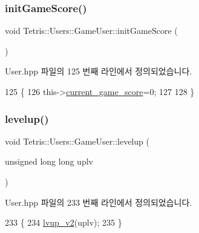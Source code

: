 \subsubsection{\texorpdfstring{init\+Game\+Score()}{initGameScore()}}
{\footnotesize\ttfamily void Tetris\+::\+Users\+::\+Game\+User\+::init\+Game\+Score (\begin{DoxyParamCaption}{ }\end{DoxyParamCaption})\hspace{0.3cm}{\ttfamily [inline]}}



User.\+hpp 파일의 125 번째 라인에서 정의되었습니다.


\begin{DoxyCode}
125                                 \{
126                 this->\hyperlink{class_tetris_1_1_users_1_1_game_user_aae9d0156964b3872f7cd3917ae662ec2}{current\_game\_score}=0;
127                 
128             \}
\end{DoxyCode}
\mbox{\label{class_tetris_1_1_users_1_1_game_user_ae5f2fd276485ee3f677896c3cc03462a}} 
\subsubsection{\texorpdfstring{levelup()}{levelup()}}
{\footnotesize\ttfamily void Tetris\+::\+Users\+::\+Game\+User\+::levelup (\begin{DoxyParamCaption}\item[{unsigned long long}]{uplv }\end{DoxyParamCaption})\hspace{0.3cm}{\ttfamily [inline]}}



User.\+hpp 파일의 233 번째 라인에서 정의되었습니다.


\begin{DoxyCode}
233                                                  \{
234                 \hyperlink{class_tetris_1_1_users_1_1_game_user_aacc605ed22d2b982a106659ef94fb3c9}{lvup\_v2}(uplv);
235             \}
\end{DoxyCode}
\mbox{\label{class_tetris_1_1_users_1_1_game_user_af8ec964e749d90e60df8a4d7c63b4017}} 
